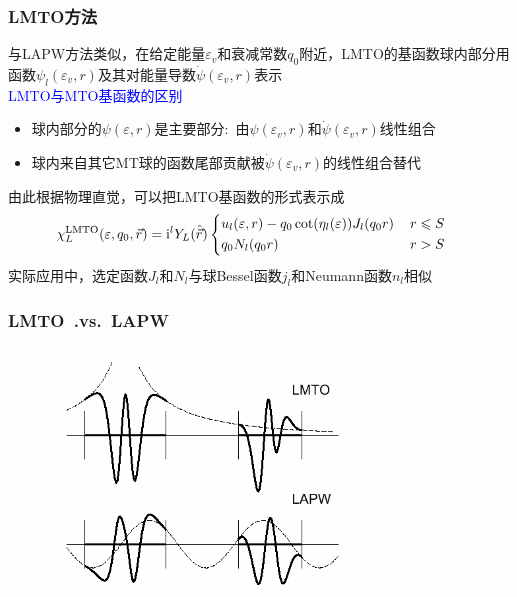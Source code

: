 \frame
{
	\frametitle{\textrm{LMTO}方法}
	与\textrm{LAPW}方法类似，在给定能量$\varepsilon_v$和衰减常数$q_0$附近，\textrm{LMTO}的基函数球内部分用函数$\psi_l(\varepsilon_v,r)$及其对能量导数$\dot\psi(\varepsilon_v,r)$表示\\
\textcolor{blue}{\textrm{LMTO}与\textrm{MTO}基函数的区别}
	\begin{itemize}
		\item 球内部分的$\psi(\varepsilon,r)$是主要部分:~由$\psi(\varepsilon_v,r)$和$\dot\psi(\varepsilon_v,r)$线性组合
		\item 球内来自其它\textrm{MT}球的函数尾部贡献被$\dot\psi(\varepsilon_v,r)$的线性组合替代
	\end{itemize}
	由此根据物理直觉，可以把\textrm{LMTO}基函数的形式表示成
		\begin{displaymath}
			\hspace*{-12pt}\chi_L^{\mathrm{LMTO}}(\varepsilon,q_0,\vec r)=\mathrm{i}^lY_L(\hat{\vec r})\left\{
			\begin{aligned}
				&u_l(\varepsilon,r)-q_0\cot(\eta_l(\varepsilon))J_l(q_0r)&\, r\leqslant S\\
				&q_0N_l(q_0r)&\, r>S
			\end{aligned}\right.
		\end{displaymath}
		实际应用中，选定函数$J_l$和$N_l$与球\textrm{Bessel}函数$j_l$和\textrm{Neumann}函数$n_l$相似
}

\frame
{
	\frametitle{\textrm{LMTO~.vs.~LAPW}}
\begin{figure}[h!]
\centering
\vspace*{-0.15in}
\includegraphics[height=2.50in,width=3.30in,viewport=0 0 440 350,clip]{Figures/LMTO-vs-LAPW.png}
\caption{\fontsize{5.5pt}{4.2pt}}%
\label{LMTO-vs-LAPW}
\end{figure}
}

